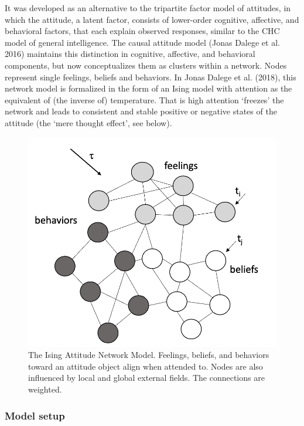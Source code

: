 \documentclass[
  a4paper,
  DIV=11,
  numbers=noendperiod,
  oneside]{scrreprt}
\begin{document}
It was developed as an alternative to the tripartite factor model of
attitudes, in which the attitude, a latent factor, consists of
lower-order cognitive, affective, and behavioral factors, that each
explain observed responses, similar to the CHC model of general
intelligence. The causal attitude model (Jonas Dalege et al. 2016)
maintains this distinction in cognitive, affective, and behavioral
components, but now conceptualizes them as clusters within a network.
Nodes represent single feelings, beliefs and behaviors. In Jonas Dalege
et al. (2018), this network model is formalized in the form of an Ising
model with attention as the equivalent of (the inverse of) temperature.
That is high attention `freezes' the network and leads to consistent and
stable positive or negative states of the attitude (the `mere thought
effect', see below).

\begin{figure}

{\centering \includegraphics{media/ch6/fig-attitude network.png}

}

\caption{The Ising Attitude Network Model. Feelings, beliefs, and
behaviors toward an attitude object align when attended to. Nodes are
also influenced by local and global external fields. The connections are
weighted.}

\end{figure}

\hypertarget{sec-Model-setup}{%
\subsubsection{Model setup}\label{sec-Model-setup}}
\end{document}
